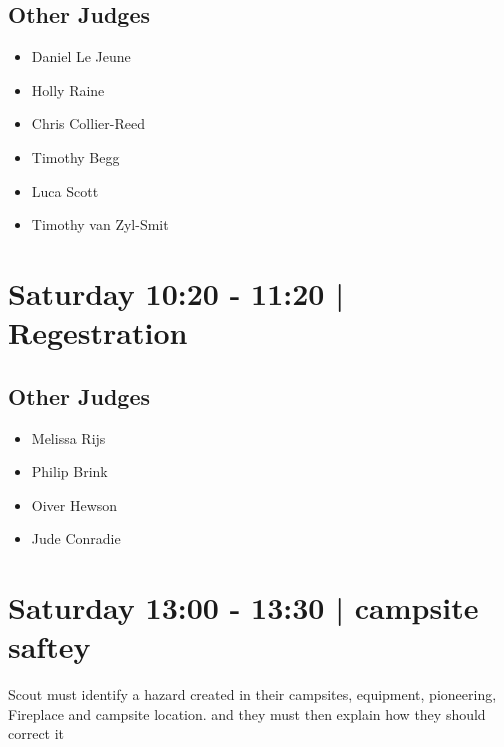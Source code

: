 \documentclass[10pt, A5]{article}
\begin{document}
                
        \subsection*{Other Judges}
        
            \begin{itemize}
                            \item Daniel Le Jeune
                            \item Holly Raine
                            \item Chris Collier-Reed
                            \item Timothy Begg
                            \item Luca Scott
                            \item Timothy van Zyl-Smit
                        \end{itemize}
        

            \section*{Saturday 10:20
        -
        11:20
        |
         Regestration}
        
                
        \subsection*{Other Judges}
        
            \begin{itemize}
                            \item Melissa Rijs
                            \item Philip Brink
                            \item Oiver Hewson
                            \item Jude Conradie
                        \end{itemize}
        

            \section*{Saturday 13:00
        -
        13:30
        |
         campsite saftey}
        
                            Scout must identify a hazard created in their campsites, equipment, pioneering, Fireplace and campsite location. and they must then explain how they should correct it
        
\end{document}
